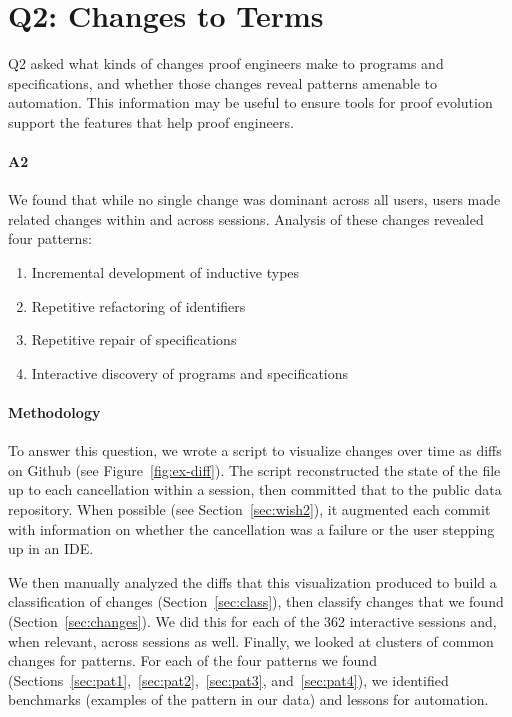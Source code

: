 \section{Q2: Changes to Terms}
\label{sec:q2}

Q2 asked what kinds of changes proof
engineers make to programs and specifications, and whether those
changes reveal patterns amenable to automation.
This information may be useful to ensure tools for proof evolution
support the features that help proof engineers.

\paragraph{A2}
We found that while no single change was dominant across
all users, users made related changes within and across sessions.
Analysis of these changes revealed four patterns:

\begin{enumerate}
\item Incremental development of inductive types
\item Repetitive refactoring of identifiers
\item Repetitive repair of specifications
\item Interactive discovery of programs and specifications
\end{enumerate}

\paragraph{Methodology}
To answer this question, we wrote a script to visualize changes over 
time as diffs on Github (see Figure~\ref{fig:ex-diff}).
The script reconstructed the state of the file up to 
each cancellation within a session, then committed that to the 
public data repository.
When possible (see Section~\ref{sec:wish2}), it augmented
each commit with information on whether the cancellation was a failure
or the user stepping up in an IDE.

We then manually analyzed the diffs that this visualization produced to 
build a classification of changes (Section~\ref{sec:class}), 
then classify changes that we found (Section~\ref{sec:changes}).
We did this for each of the 362 interactive sessions and, when relevant,
across sessions as well.
Finally, we looked at clusters of common changes for patterns.
For each of the four patterns we found
(Sections~\ref{sec:pat1},~\ref{sec:pat2},~\ref{sec:pat3}, and~\ref{sec:pat4}),
we identified benchmarks (examples of the pattern in our data)
and lessons for automation.


